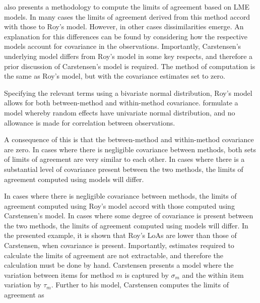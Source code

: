 \documentclass[12pt, a4paper]{report}
\theoremstyle{plain}
\theoremstyle{definition}
\theoremstyle{remark}
\begin{document}
	





\citet{BXC2008} also presents a methodology to compute the limits of agreement based on LME models. In many cases the limits of agreement derived from this method accord with those to Roy's model. However, in other cases dissimilarities emerge. An explanation for this differences can be found by considering how the respective models account for covariance in the observations. Importantly, Carstensen's underlying model differs from Roy's model in some key respects, and therefore a prior discussion of Carstensen's model is required.
The method of computation is the same as Roy's model, but with the covariance estimates set to zero.

Specifying the relevant terms using a bivariate normal distribution, Roy's model allows for both between-method and within-method covariance. \citet{BXC2008} formulate a model whereby random effects have univariate normal distribution, and no allowance is made for correlation between observations.

A consequence of this is that the between-method and within-method covariance are zero. In cases where there is negligible covariance between methods, both sets of limits of agreement are very similar to each other. In cases where there is a substantial level of covariance present between the two methods, the limits of agreement computed using models will differ.

In cases where there is negligible covariance between methods, the limits of agreement computed using Roy's model accord with those computed using Carstensen's model. In cases where some degree of covariance is present between the two methods, the limits of agreement computed using models will differ. In the presented example, it is shown that Roy's LoAs are lower than those of Carstensen, when covariance is present. Importantly, estimates required to calculate the limits of agreement are not extractable, and therefore the calculation must be done by hand. Carstensen presents a model where the variation between items for
method $m$ is captured by $\sigma_m$ and the within item variation
by $\tau_m$. 	Further to his model, Carstensen computes the limits of agreement
as
\end{document}
